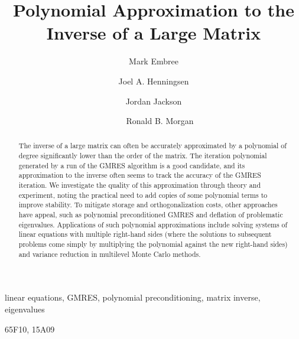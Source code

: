 \documentclass{siamart}
\begin{document}
\title{Polynomial Approximation to the \\ Inverse of a Large Matrix}

\author{Mark Embree\footnotemark[2]
\and Joel A. Henningsen\footnotemark[3]\and
Jordan Jackson\footnotemark[2]\and\newline\ \ \ Ronald B. Morgan\footnotemark[3] }

\maketitle

\renewcommand{\thefootnote}{\fnsymbol{footnote}}

\renewcommand{\thefootnote}{\arabic{footnote}}

\begin{abstract}
The inverse of a large matrix can often be accurately approximated by a polynomial of degree significantly lower than the order of the matrix.  The iteration polynomial generated by a run of the GMRES algorithm is a good candidate, and its approximation to the inverse often seems to track the accuracy of the GMRES iteration.  We investigate the quality of this approximation through theory and experiment, noting the practical need to add copies of some polynomial terms to improve stability.  To mitigate storage and orthogonalization costs, other approaches have appeal, such as polynomial preconditioned GMRES and deflation of problematic eigenvalues.  Applications of such polynomial approximations include solving systems of linear equations with multiple right-hand sides (where the solutions to subsequent problems come simply by multiplying the polynomial against the new right-hand sides) and variance reduction in multilevel Monte Carlo methods.

\end{abstract}

\begin{keywords}
linear equations, GMRES, polynomial preconditioning, matrix inverse, eigenvalues
\end{keywords}

\begin{AMS}
65F10, 15A09
\end{AMS}
\end{document}

